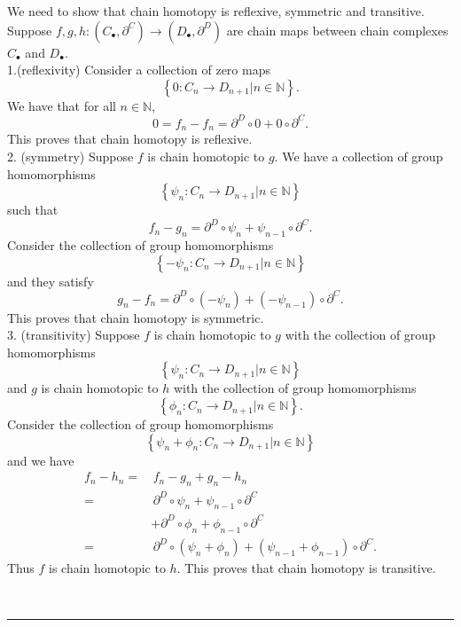 \documentclass[a4paper, 11pt]{article}
\begin{document}
\begin{solution}
We need to show that chain homotopy is reflexive, symmetric and transitive. Suppose \(f,g,h:(C_\bullet,\partial^C) \rightarrow (D_\bullet,\partial^D)\) are chain maps between chain complexes 
\(C_\bullet\) and \(D_\bullet\). 
\\ 
1.(reflexivity) Consider a collection of zero maps 
$$\left\{ 0:C_n\rightarrow D_{n+1} | n\in \mathbb{N} \right\}.$$
We have that for all \(n\in \mathbb{N}\), 
$$0=f_n-f_n=\partial^D\circ 0+0\circ \partial^C.$$
This proves that chain homotopy is reflexive.
\\ 
2. (symmetry) Suppose \(f\) is chain homotopic to \(g\). We have a collection of group homomorphisms 
$$\left\{ \psi_n:C_n\rightarrow D_{n+1}|n\in \mathbb{N} \right\}$$
such that 
$$f_n-g_n=\partial^D\circ \psi_n+\psi_{n-1}\circ \partial^C.$$
Consider the collection of group homomorphisms
$$\left\{ -\psi_n:C_n\rightarrow D_{n+1}|n\in \mathbb{N} \right\}$$
and they satisfy 
$$g_n-f_n=\partial^D\circ (-\psi_n)+(-\psi_{n-1})\circ \partial^C.$$
This proves that chain homotopy is symmetric.
\\ 
3. (transitivity) Suppose \(f\) is chain homotopic to \(g\) with the collection of group homomorphisms 
$$\left\{ \psi_n:C_n\rightarrow D_{n+1}|n\in \mathbb{N} \right\}$$
and \(g\) is chain homotopic to \(h\) with the collection of group homomorphisms 
$$\left\{ \phi_n:C_n\rightarrow D_{n+1}|n\in \mathbb{N} \right\}.$$
Consider the collection of group homomorphisms
$$\left\{ \psi_n+\phi_n:C_n\rightarrow D_{n+1}|n\in \mathbb{N} \right\}$$
and we have 
\begin{align*}
    f_n-h_n = &\, f_n-g_n+g_n-h_n\\ 
            = &\, \partial^D\circ \psi_n+\psi_{n-1}\circ \partial^C\\ 
              & +\partial^D\circ \phi_n+\phi_{n-1}\circ \partial^C\\ 
            = &\, \partial^D\circ (\psi_n+\phi_n)+(\psi_{n-1}+\phi_{n-1})\circ \partial^C.
\end{align*}
Thus \(f\) is chain homotopic to \(h\). This proves that chain homotopy is transitive.
\end{solution}
\\  
\noindent\rule{7in}{2.8pt}
\end{document}
